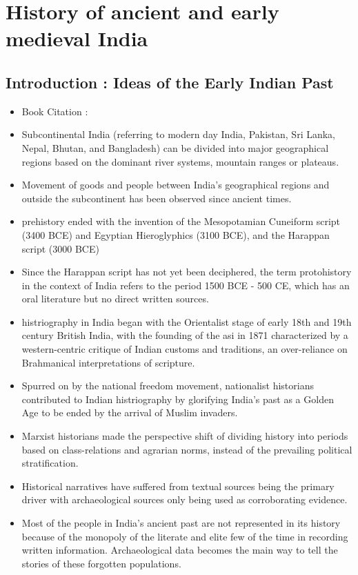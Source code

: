 \chapter{History of ancient and early medieval India}

\section*{Introduction : Ideas of the Early Indian Past}
\begin{itemize}
    \item Book Citation : \cite{Upinder_Singh_2009}
    \item Subcontinental India (referring to modern day India, Pakistan, Sri Lanka, Nepal, Bhutan, and Bangladesh) can be divided into major geographical regions based on the dominant river systems, mountain ranges or plateaus.
    \item Movement of goods and people between India's geographical regions and outside the subcontinent has been observed since ancient times.
    \item \Gls{prehistory} ended with the invention of the Mesopotamian Cuneiform script (3400 BCE) and Egyptian Hieroglyphics (3100 BCE), and the Harappan script (3000 BCE)
    \item Since the Harappan script has not yet been deciphered, the term protohistory in the context of India refers to the period 1500 BCE - 500 CE, which has an oral literature but no direct written sources.
    \item \Gls{histriography} in India began with the Orientalist stage of early 18th and 19th century British India, with the founding of the \acrshort{asi} in 1871 characterized by a western-centric critique of Indian customs and traditions, an over-reliance on Brahmanical interpretations of scripture.
    \item Spurred on by the national freedom movement, nationalist historians contributed to Indian histriography by glorifying India's past as a Golden Age to be ended by the arrival of Muslim invaders.
    \item Marxist historians made the perspective shift of dividing history into periods based on class-relations and agrarian norms, instead of the prevailing political stratification.
    \item Historical narratives have suffered from textual sources being the primary driver with archaeological sources only being used as corroborating evidence.
    \item Most of the people in India's ancient past are not represented in its history because of the monopoly of the literate and elite few of the time in recording written information. Archaeological data becomes the main way to tell the stories of these forgotten populations.
\end{itemize}

